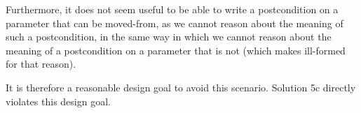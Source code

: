 Furthermore, it does not seem useful to be able to write a postcondition on a parameter that can be moved-from, as we cannot reason about the meaning of such a postcondition, in the same way in which we cannot reason about the meaning of a postcondition on a parameter that is not  (which \cite{P2900R8} makes ill-formed for that reason).

It is therefore a reasonable design goal to avoid this scenario. Solution 5c directly violates this design goal.


%



